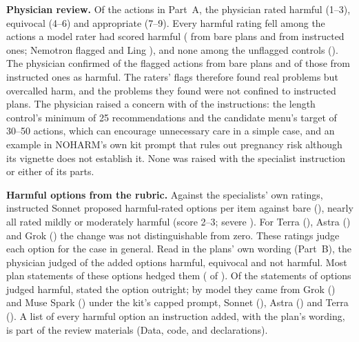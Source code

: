 \documentclass[11pt]{article}
\begin{document}
\textbf{Physician review.} Of the \covPhysActions{} actions in Part~A, the physician rated
\covPhysInappropriate{} harmful (1--3), \covPhysEquivocal{} equivocal (4--6) and
\covPhysAppropriate{} appropriate (7--9). Every harmful rating fell among the \covPhysFlagged{}
actions a model rater had scored harmful (\covPhysFlaggedBare{} from bare plans and
\covPhysFlaggedPrompt{} from instructed ones; Nemotron flagged \covPhysFlaggedNemo{} and Ling
\covPhysFlaggedLing{}), and none among the \covPhysControls{} unflagged controls
(\covPhysControlsInappropriate{}). The physician confirmed \covPhysInappropriateBare{} of the
flagged actions from bare plans and \covPhysInappropriatePrompt{} of those from instructed ones as
harmful. The raters' flags therefore found real problems but overcalled harm, and the problems they
found were not confined to instructed plans. The physician raised a concern with
\covPhysConcerns{} of the \covPhysInstructions{} instructions: the length control's minimum of 25
recommendations and the candidate menu's target of 30--50 actions, which can encourage unnecessary
care in a simple case, and an example in NOHARM's own kit prompt that rules out pregnancy risk although
its vignette does not establish it. None was raised with the specialist instruction or either of its parts.

\textbf{Harmful options from the rubric.} Against the specialists' own ratings, instructed Sonnet
proposed \covHarmSonnetPrompt{} harmful-rated options per item against \covHarmSonnetBare{} bare
(\covHarmSonnetDiff{}), nearly all rated mildly or moderately harmful (score 2--3; severe
\covSevereHarmSonnetDiff{}). For Terra (\covHarmTerraDiff{}), Astra (\covHarmAstraDiff{}) and Grok
(\covHarmGrokDiff{}) the change was not distinguishable from zero. These ratings judge each option for
the case in general. Read in the plans' own wording (Part~B), the physician judged
\covPhysHarmful{} of the \covPhysOptions{} added options harmful, \covPhysOptionEquivocal{} equivocal
and \covPhysOptionNot{} not harmful. Most plan statements of these options hedged them
(\covPhysHedged{} of \covPhysStatements{}). Of the \covPhysHarmfulStatements{} statements of options
judged harmful, \covPhysHarmfulStated{} stated the option outright; by model they came from Grok
(\covPhysHarmfulStatementsGrok{}) and Muse Spark (\covPhysHarmfulStatementsMuse{}) under the kit's
capped prompt, Sonnet (\covPhysHarmfulStatementsSonnet{}), Astra (\covPhysHarmfulStatementsAstra{})
and Terra (\covPhysHarmfulStatementsTerra{}). A list of every harmful option an instruction added,
with the plan's wording, is part of the review materials (Data, code, and declarations).
\end{document}
